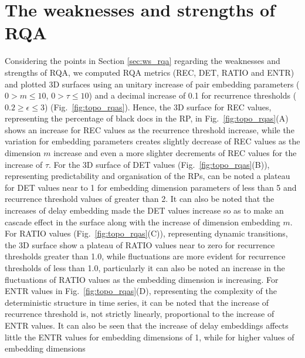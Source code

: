 %

\newpage
\section{The weaknesses and strengths of RQA}
Considering the points in Section \ref{sec:ws_rqa} regarding 
the weaknesses and strengths of RQA, we computed RQA metrics 
(REC, DET, RATIO and ENTR) and plotted 3D surfaces using an unitary 
increase of pair embedding parameters 
($0 > m \le 10$, $0 > \tau \le 10$) 
and a decimal increase of 0.1 for recurrence thresholds 
($ 0.2 \ge \epsilon \le 3 $) (Fig.~\ref{fig:topo_rqas}). 
Hence, the 3D surface for REC values, representing the percentage of 
black docs in the RP, in Fig.~\ref{fig:topo_rqas}(A)
shows an increase for REC values as the recurrence threshold increase,
while the variation for embedding parameters creates slightly decrease 
of REC values as the dimension $m$ increase and even a more slighter 
decrements of REC values for the increase of $\tau$.
For the 3D surface of DET values (Fig.~\ref{fig:topo_rqas}(B)), representing 
predictability and organisation of the RPs, can be noted a plateau
for DET values near to 1 for embedding dimension parameters of less 
than 5 and recurrence threshold values of greater than 2. 
It can also be noted that the increases of delay embedding made 
the DET values increase so as to make an cascade effect in the surface 
along with the increase of dimension embedding $m$.
For RATIO values (Fig.~\ref{fig:topo_rqas}(C)),
representing dynamic transitions, the 3D surface show a plateau of RATIO values 
near to zero for recurrence thresholds greater than 1.0, while 
fluctuations are more evident for recurrence thresholds of less than 1.0,
particularly it can also be noted an increase in the fluctuations of 
RATIO values as the embedding dimension is increasing. 
For ENTR values in Fig.~\ref{fig:topo_rqas}(D), 
representing the complexity of the deterministic structure in time series, 
it can be noted that the increase of recurrence threshold is, 
not strictly linearly, proportional to the increase of ENTR values. 
It can also be seen that the increase of delay embeddings affects 
little the ENTR values for embedding dimensions of 1, while 
for higher values of embedding dimensions 
